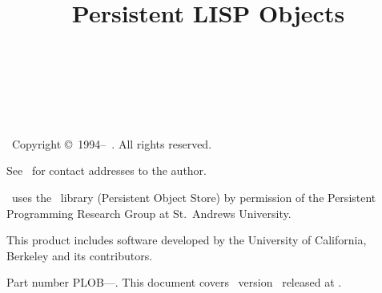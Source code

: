 %

\title{Persistent LISP Objects\\
\plob\\[\bigskipamount]
\thistitle\\[\bigskipamount]}

\maketitle

\clearpage\thispagestyle{empty}

\vspace*{\fill}%
\noindent\plob\ Copyright \copyright\ 1994--\thisyear\ \thisauthor. All
rights reserved.

\vspace*{0.5cm}%
\noindent{}See \ for contact addresses
to the author.

\vspace*{0.5cm}%
\noindent{}\plob\ uses the \postore\ library (Persistent Object Store)
by permission of the Persistent Programming Research Group at St.\ 
Andrews University.

\vspace*{0.5cm}%
\noindent{}This product includes software developed by the University of
California, Berkeley and its contributors.

\vspace*{0.5cm}%
\noindent{}Part number PLOB--\thispartnumber--\thisversion. This
document covers \plob\ version \thisversion\ released at \thisdate.

\setcounter{page}{2}\clearpage

